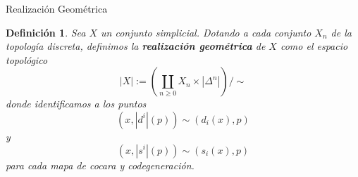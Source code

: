 \documentclass[11pt]{beamer}
\newcommand{\N}{\mathbb{N}}
\newcommand{\nat}[1]{[\![#1]\!]}
\newcommand{\ord}[1]{\nat{#1}}
\newcommand{\cat}[1]{\mathsf{#1}}
\renewcommand{\ss}[1]{\Delta^{#1}}
\newcommand{\homcomplex}{\mathbf{Hom}}
\newtheorem{defs}{Definición}
\newtheorem{teo}{Teorema}
\begin{document}
%
%
%


\begin{frame}{Realización Geométrica}
\begin{defs} Sea $X$ un conjunto simplicial. Dotando a cada conjunto $X_n$ de la topología discreta, definimos la \textbf{realización geométrica} de $X$ como el espacio topológico 
\[
|X| := \left(\coprod_{n \geq 0}X_n \times |\ss{n}|\right)\Big/\sim
\]
donde identificamos a los puntos \[(x,|d^i|(p)) \sim (d_i(x),p)\] y \[(x,|s^i|(p)) \sim (s_i(x),p)\] para cada mapa de cocara y codegeneración.
\end{defs}
\end{frame}
\end{document}
